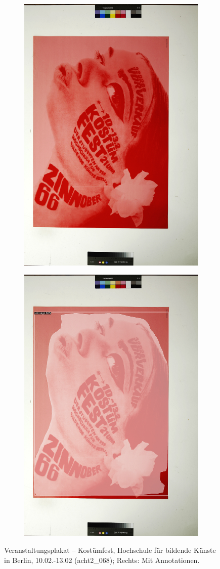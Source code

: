 \documentclass[a4paper,12pt,ngerman]{article}
\begin{document}
\newpage
\begin{landscape}
\begin{figure}[ht]
	\begin{subfigure}[b]{0.5\linewidth}
	\centering
	\includegraphics[height=\linewidth]{Abbildung_27_(acht2_068)}
	\end{subfigure}
	\begin{subfigure}[b]{0.5\linewidth}
	\centering
	\includegraphics[height=\linewidth]{Abbildung_27_(acht2_068)_with_detections}
	\end{subfigure}
	\caption{Veranstaltungsplakat -- Kostümfest, Hochschule für bildende Künste in Berlin, 10.02.-13.02 (acht2\_068); Rechts: Mit Annotationen.}
\end{figure}
\end{landscape}
\end{document}
